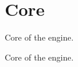 \hypertarget{group___core}{
\section{\-Core}
\label{group___core}
}


\-Core of the engine.  


\-Core of the engine. 